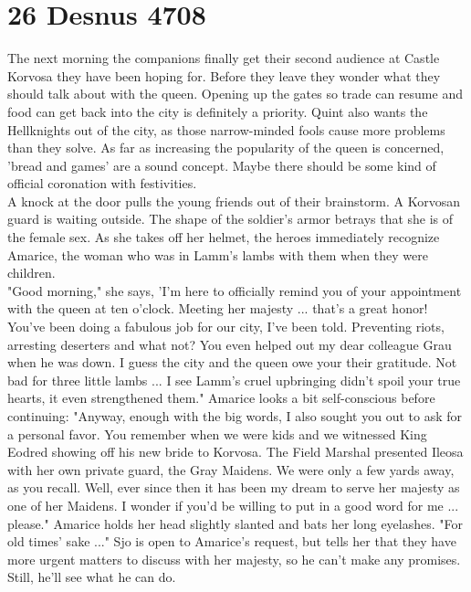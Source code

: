 \section{26 Desnus 4708}

The next morning the companions finally get their second audience at Castle Korvosa they have been hoping for. Before they leave they wonder what they should talk about with the queen. Opening up the gates so trade can resume and food can get back into the city is definitely a priority. Quint also wants the Hellknights out of the city, as those narrow-minded fools cause more problems than they solve. As far as increasing the popularity of the queen is concerned, 'bread and games' are a sound concept. Maybe there should be some kind of official coronation with festivities.\\

A knock at the door pulls the young friends out of their brainstorm. A Korvosan guard is waiting outside. The shape of the soldier's armor betrays that she is of the female sex. As she takes off her helmet, the heroes immediately recognize Amarice, the woman who was in Lamm's lambs with them when they were children.\\

"Good morning," she says, 'I'm here to officially remind you of your appointment with the queen at ten o'clock. Meeting her majesty ... that's a great honor! You've been doing a fabulous job for our city, I've been told. Preventing riots, arresting deserters and what not? You even helped out my dear colleague Grau when he was down. I guess the city and the queen owe your their gratitude. Not bad for three little lambs ... I see Lamm's cruel upbringing didn't spoil your true hearts, it even strengthened them." Amarice looks a bit self-conscious before continuing: "Anyway, enough with the big words, I also sought you out to ask for a personal favor. You remember when we were kids and we witnessed King Eodred showing off his new bride to Korvosa. The Field Marshal presented Ileosa with her own private guard, the Gray Maidens. We were only a few yards away, as you recall. Well, ever since then it has been my dream to serve her majesty as one of her Maidens. I wonder if you'd be willing to put in a good word for me ... please." Amarice holds her head slightly slanted and bats her long eyelashes. "For old times' sake ..." Sjo is open to Amarice's request, but tells her that they have more urgent matters to discuss with her majesty, so he can't make any promises. Still, he'll see what he can do.\\


